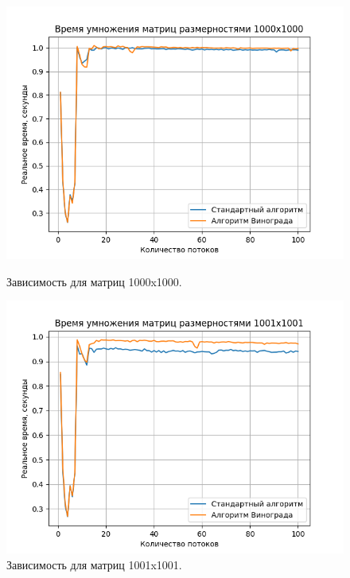 \documentclass[a4paper,12pt]{article}
\begin{document}
\begin{figure}[H]
\begin{center}
\begin{minipage}[H]{0.48\linewidth}
\includegraphics[width=1\linewidth]{1000x1000.png}
\caption{Зависимость для матриц 1000x1000.}
\label{ris:experimoriginal}
\end{minipage}
\hfill
\begin{minipage}[H]{0.48\linewidth}
\includegraphics[width=1\linewidth]{1001x1001.png}
\caption{Зависимость для матриц 1001x1001.}
\label{ris:experimcoded}
\end{minipage}
\end{center}
\end{figure}
\end{document}
